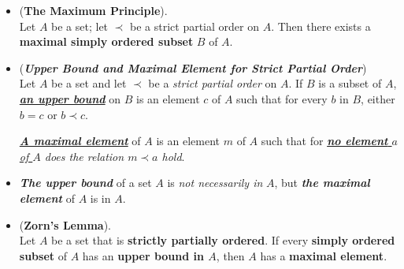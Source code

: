 \documentclass[11pt]{article}
\begin{document}
\begin{itemize}
\item \begin{theorem} (\textbf{The Maximum Principle}).\\
Let $A$ be a set; let $\prec$ be a strict partial order on $A$. Then there exists a \textbf{maximal simply ordered subset} $B$ of $A$.
\end{theorem}

\item \begin{definition} (\emph{\textbf{Upper Bound and Maximal Element for Strict Partial Order}})\\
Let $A$ be a set and let $\prec$ be a \emph{strict partial order} on $A$. If $B$ is a subset of $A$, \underline{\emph{\textbf{an upper bound}}} on $B$ is an element $c$ of $A$ such that for every $b$ in $B$, either $b = c$ or $b \prec c$. 

\underline{\emph{\textbf{A maximal element}}} of $A$ is an element $m$ of $A$ such that for \emph{\underline{\textbf{no element} $a$ of $A$} does the relation $m \prec a$ hold}.
\end{definition}

\item \begin{remark}
\emph{\textbf{The upper bound}} of a set $A$ is \emph{not necessarily in} $A$, but \emph{\textbf{the maximal element}} of $A$ is in $A$. 
\end{remark}

\item \begin{theorem} (\textbf{Zorn's Lemma}). \citep{munkres2000topology} \\
Let $A$ be a set that is \textbf{strictly partially ordered}. If every \textbf{simply ordered subset} of $A$ has an \textbf{upper bound in $A$}, then $A$ has a \textbf{maximal element}.
\end{theorem}
\end{itemize}
\end{document}
